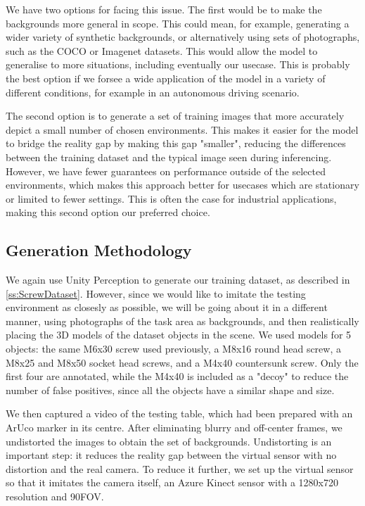 We have two options for facing this issue. The first would be to make the backgrounds more general in scope. This could mean, for example, generating a wider variety of synthetic backgrounds, or alternatively using sets of photographs, such as the COCO or Imagenet datasets\cite{DPOD}. This would allow the model to generalise to more situations, including eventually our usecase. This is probably the best option if we forsee a wide application of the model in a variety of different conditions, for example in an autonomous driving scenario.

The second option is to generate a set of training images that more accurately depict a small number of chosen environments. This makes it easier for the model to bridge the reality gap by making this gap "smaller", reducing the differences between the training dataset and the typical image seen during inferencing. However, we have fewer guarantees on performance outside of the selected environments, which makes this approach better for usecases which are stationary or limited to fewer settings. This is often the case for industrial applications, making this second option our preferred choice.

\subsection{Generation Methodology}

We again use Unity Perception to generate our training dataset, as described in \ref{ss:ScrewDataset}. However, since we would like to imitate the testing environment as closesly as possible, we will be going about it in a different manner, using photographs of the task area as backgrounds, and then realistically placing the 3D models of the dataset objects in the scene. We used models for 5 objects: the same M6x30 screw used previously, a M8x16 round head screw, a M8x25 and M8x50 socket head screws, and a M4x40 countersunk screw. Only the first four  are annotated, while the M4x40 is included as a "decoy" to reduce the number of false positives, since all the objects have a similar shape and size.

We then captured a video of the testing table, which had been prepared with an ArUco marker in its centre. After eliminating blurry and off-center frames, we undistorted the images to obtain the set of backgrounds. Undistorting is an important step: it reduces the reality gap between the virtual sensor with no distortion and the real camera. To reduce it further, we set up the virtual sensor so that it imitates the camera itself, an Azure Kinect sensor with a 1280x720 resolution and 90\degree FOV.

